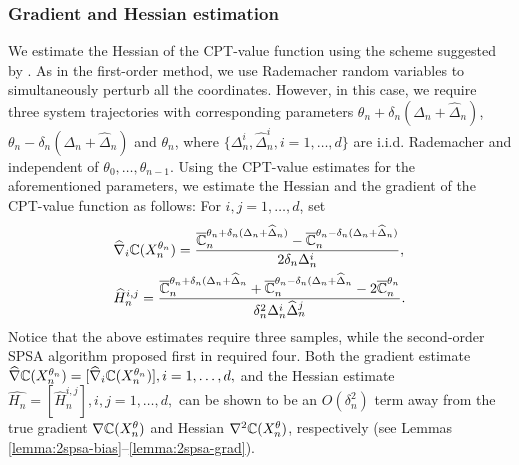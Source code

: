 \subsubsection*{Gradient and Hessian estimation}
We estimate the Hessian of the CPT-value function using the scheme suggested by \cite{bhatnagar2015simultaneous}. As in the first-order method, we use Rademacher random variables to simultaneously perturb all the coordinates. However, in this case, we require three system trajectories with corresponding  parameters $\theta_n+\delta_n(\Delta_n+\widehat\Delta_n)$, $\theta_n-\delta_n(\Delta_n+\widehat\Delta_n)$ and $\theta_n$, where $\{\Delta_n^i, \widehat\Delta_n^i, i=1,\ldots,d\}$ are i.i.d. Rademacher and independent of $\theta_0,\ldots,\theta_{n-1}$. Using the CPT-value estimates for the aforementioned  parameters, we estimate the Hessian and the gradient of the CPT-value function as follows: For $i,j=1,\ldots,d$, set
\begin{align*}
&\widehat \nabla_{i} \mathbb{C}(X_n^{\theta_n})=\dfrac{\overline {\mathbb{C}}_n^{\theta_n+\delta_n(\Delta_n+\widehat\Delta_n)} - \overline {\mathbb{C}}_n^{\theta_n-\delta_n(\Delta_n+\widehat\Delta_n)}}{2\delta_n \Delta_n^{i}},\\ 
&\widehat H_n^{i,j}=\dfrac{\overline {\mathbb{C}}_n^{\theta_n+\delta_n(\Delta_n+\widehat\Delta_n} + \overline {\mathbb{C}}_n^{\theta_n-\delta_n(\Delta_n+\widehat\Delta_n} - 2\overline {\mathbb{C}}_n^{\theta_n}}{\delta_n^2 \Delta_n^{i}\widehat\Delta_n^{j}}.
\end{align*}
Notice that the above estimates require three samples, while the second-order SPSA algorithm proposed first in \cite{spall2000adaptive} required four.
%
Both the gradient estimate $\widehat \nabla \mathbb{C}(X_n^{\theta_n}) = [\widehat \nabla_i \mathbb{C}(X_n^{\theta_n})], i=1,\ldots,d,$ and the Hessian estimate $\widehat{H_n} = [\widehat H_n^{i,j}], i,j=1,\ldots,d,$ can be shown to be an $O(\delta_n^2)$ term away from the true gradient $\nabla \mathbb{C}(X^\theta_n)$ and Hessian $\nabla^2  \mathbb{C}(X^\theta_n)$, respectively (see Lemmas \ref{lemma:2spsa-bias}--\ref{lemma:2spsa-grad}).

%
%

